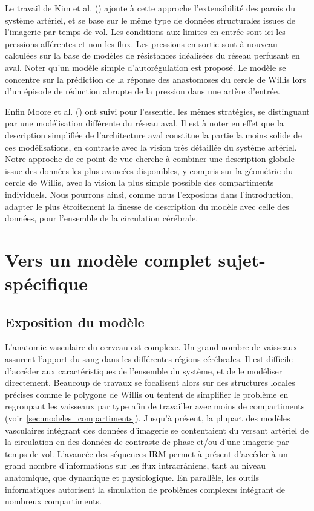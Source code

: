 Le travail de Kim et al. (\cite{Kim2006}) ajoute à cette approche l'extensibilité des parois du système
artériel, et se base sur le même type de données structurales issues de l'imagerie par temps de vol.
Les conditions aux limites en entrée sont ici les pressions afférentes et non les flux. Les pressions en
sortie sont à nouveau calculées sur la base de modèles de résistances idéalisées du réseau perfusant
en aval. Noter qu'un modèle simple d'autorégulation est proposé. Le modèle se concentre sur la
prédiction de la réponse des anastomoses du cercle de Willis lors d'un épisode de réduction abrupte
de la pression dans une artère d'entrée.

Enfin Moore et al. (\cite{Moore2006}) ont suivi pour l'essentiel les mêmes stratégies, se distinguant par une
modélisation différente du réseau aval. Il est à noter en effet que la description simplifiée de
l'architecture aval constitue la partie la moins solide de ces modélisations, en contraste avec la vision
très détaillée du système artériel. Notre approche de ce point de vue cherche à combiner une
description globale issue des données les plus avancées disponibles, y compris sur la géométrie du
cercle de Willis, avec la vision la plus simple possible des compartiments individuels. Nous pourrons
ainsi, comme nous l'exposions dans l'introduction, adapter le plus étroitement la finesse de description
du modèle avec celle des données, pour l'ensemble de la circulation cérébrale.
\section{Vers un modèle complet sujet-spécifique}
\subsection{Exposition du modèle}
L’anatomie vasculaire du cerveau est complexe. Un grand nombre de vaisseaux assurent
l’apport du sang dans les différentes régions cérébrales. Il est difficile d’accéder aux caractéristiques de l’ensemble du système, et de le modéliser directement. Beaucoup de travaux se focalisent alors sur
des structures locales précises comme le polygone de Willis ou tentent de simplifier le problème en
regroupant les vaisseaux par type afin de travailler avec moins de compartiments (voir~\ref{sec:modeles_compartiments}). Jusqu’à présent, la plupart des modèles vasculaires intégrant des données d’imagerie se contentaient du
versant artériel de la circulation en des données de contraste de phase et/ou d’une imagerie par temps
de vol. L’avancée des séquences IRM permet à présent d’accéder à un grand nombre d’informations
sur les flux intracrâniens, tant au niveau anatomique, que dynamique et physiologique. En parallèle,
les outils informatiques autorisent la simulation de problèmes complexes intégrant de nombreux
compartiments.

